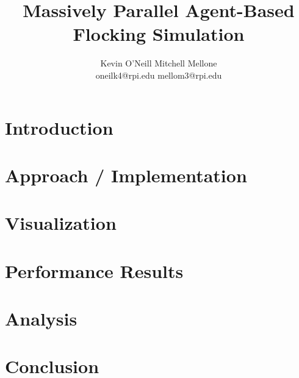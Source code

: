 \documentclass[10pt, twocolumn]{article}
\title{Massively Parallel Agent-Based Flocking Simulation}
\author{Kevin O'Neill \hspace{3cm} Mitchell Mellone \\ oneilk4@rpi.edu \hfill mellom3@rpi.edu}
\date{}
\begin{document}
\maketitle

\begin{abstract}
  
\end{abstract}

\section*{Introduction}


\section*{Approach / Implementation}


\section*{Visualization}


\FloatBarrier
\section*{Performance Results}

\FloatBarrier

\section*{Analysis}


\section*{Conclusion}


\printbibliography[title=References]
\end{document}
